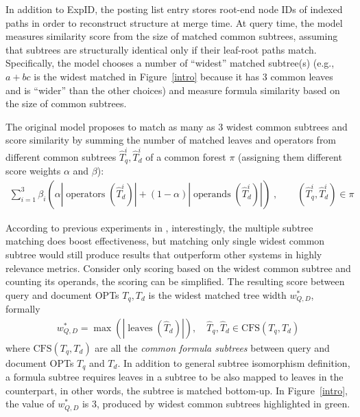 \documentclass[runningheads]{llncs}
\begin{document}
In addition to ExpID, the posting list entry stores root-end node IDs of indexed paths in order to reconstruct structure at merge time.
At query time, the model measures similarity score from the size of matched common subtrees, assuming that subtrees are structurally identical only if their leaf-root paths match.
%
Specifically, the model chooses a number of ``widest'' matched subtree(s) (e.g., $a+bc$ is the widest matched in Figure~\ref{intro} because it has 3 common leaves and is ``wider'' than the other choices) and measure formula similarity based on the size of common subtrees.

The original model proposes to match as many as 3 widest common subtrees and score similarity by summing the number of matched leaves and operators from different common subtrees $\hat{T}_q^i, \hat{T}_d^i$ of a common forest $\pi$ (assigning them different score weights $\alpha$ and $\beta$):
\begin{align}
\label{eq:1}
\sum^3_{i=1} \beta_i \left( \alpha \left|\operatorname{operators}(\hat{T}_d^i)\right| + (1 - \alpha) \left|\operatorname{operands}(\hat{T}_d^i)\right| \right)\;, \qquad (\hat{T}_q^i, \hat{T}_d^i) \in \pi
\end{align}

%
According to previous experiments in \cite{a0_2019}, interestingly, the multiple subtree matching does boost effectiveness, but matching only single widest common subtree would still produce results that outperform other systems in highly relevance metrics.
%
Consider only scoring based on the widest common subtree and counting its operands, the scoring can be simplified. The resulting score between query and document OPTs $T_q, T_d$ is the widest matched tree width $w^*_{Q, D}$, formally
\begin{align}
\label{eq:2}
w^*_{Q, D} = \max(|\operatorname{leaves}(\hat{T}_d)|), \quad \hat{T}_q, \hat{T}_d \in \text{CFS}(T_q, T_d)
\end{align}
where
$\text{CFS}(T_q, T_d)$ are all the \textit{common formula subtrees} between query and document OPTs $T_q$ and $T_d$.
In addition to general subtree isomorphism definition, a formula subtree requires leaves in a subtree to be also mapped to leaves in the counterpart, in other words, the subtree is matched bottom-up.
%
In Figure~\ref{intro}, the value of $w^*_{Q, D}$ is 3, produced by widest common subtrees highlighted in green.
\end{document}
